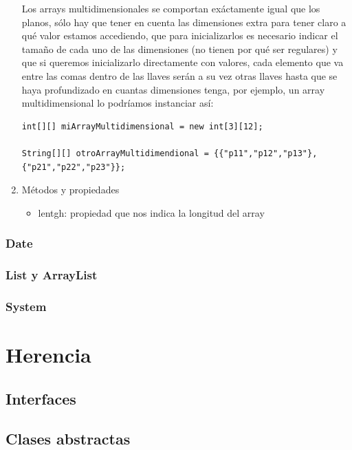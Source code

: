 \documentclass[11pt]{article}
\begin{document}
\begin{enumerate}
Los arrays multidimensionales se comportan exáctamente igual que los planos, sólo hay que tener en cuenta las dimensiones extra para tener claro a qué valor estamos accediendo, que para inicializarlos es necesario indicar el tamaño de cada uno de las dimensiones (no tienen por qué ser regulares) y que si queremos inicializarlo directamente con valores, cada elemento que va entre las comas dentro de las llaves serán a su vez otras llaves hasta que se haya profundizado en cuantas dimensiones tenga, por ejemplo, un array multidimensional lo podríamos instanciar así:

\begin{verbatim}
int[][] miArrayMultidimensional = new int[3][12];

String[][] otroArrayMultidimendional = {{"p11","p12","p13"},{"p21","p22","p23"}};
\end{verbatim}
\item Métodos y propiedades
\label{sec:org67d6d5b}
\begin{itemize}
\item lentgh: propiedad que nos indica la longitud del array
\end{itemize}
\end{enumerate}
\subsubsection{Date}
\label{sec:org19819c4}
\subsubsection{List y ArrayList}
\label{sec:orgd9385ff}
\subsubsection{System}
\label{sec:orgf70bfd5}
\section{Herencia}
\label{sec:org9bfca33}
\subsection{Interfaces}
\label{sec:orgfe47fda}
\subsection{Clases abstractas}
\label{sec:org56ef7b3}
\end{document}
